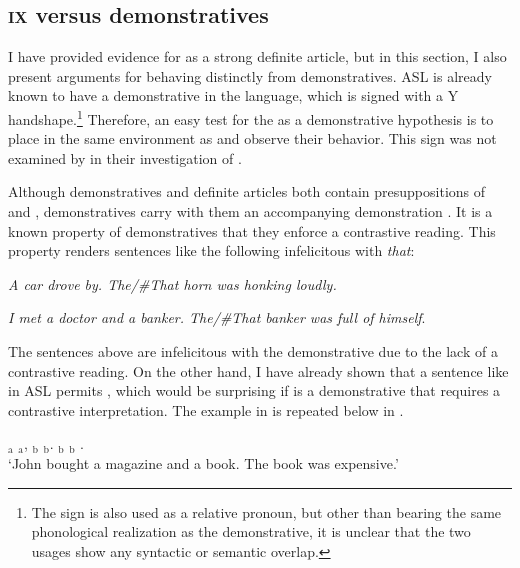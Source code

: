 \documentclass[output=paper,
modfonts
]{langscibook}
\begin{document}
\subsection{\textsc{ix} versus demonstratives}

I have provided evidence for  as a strong definite article, but in this section, I also present arguments for  behaving distinctly from demonstratives. ASL is already known to have a demonstrative  in the language, which is signed with a Y handshape.\footnote{The sign  is also used as a relative pronoun, but other than bearing the same phonological realization as the demonstrative, it is unclear that the two usages show any syntactic or semantic overlap.} Therefore, an easy test for the  as a demonstrative hypothesis is to place  in the same environment as  and observe their behavior. This sign was not examined by \citet{KoulidobrovaLilloMartin2016} in their investigation of . 

Although demonstratives and definite articles both contain presuppositions of  and , demonstratives carry with them an accompanying demonstration \citep{Roberts2002}. It is a known property of demonstratives that they enforce a contrastive reading. This property renders sentences like the following infelicitous with \textit{that}:

\begin{exe}
\ex\label{ex:irani:25} \textit{A car drove by. The\textnormal{/}\textnormal{\#}That horn was honking loudly.} \citep[70]{Wolter2006}

\ex\label{ex:irani:26} \textit{I met a doctor and a banker. The\textnormal{/}\textnormal{\#}That banker was full of himself}.
\end{exe} 

The sentences above are infelicitous with the demonstrative due to the lack of a contrastive reading. On the other hand, I have already shown that a sentence like  in ASL permits , which would be surprising if  is a demonstrative that requires a contrastive interpretation. The example in  is repeated below in . 

\begin{exe}
\ex \label{ex:irani:27}  $_\text{a}$ $_\text{a}$, $_\text{b}$ $_\text{b}$. $_\text{b}$ $_\text{b}$ .\\
`John bought a magazine and a book. The book was expensive.'
\end{exe}
\end{document}
